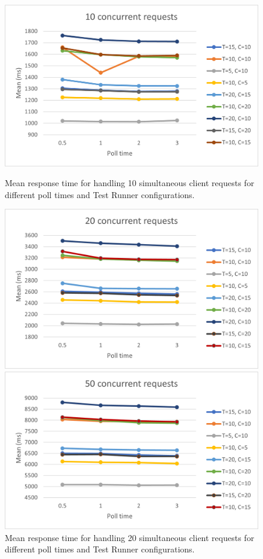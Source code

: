 \begin{figure}[!tbp]
  \centering
  \begin{minipage}[t]{0.4\textwidth}
    \includegraphics[scale=0.65]{images/10.png}
    \caption{Mean response time for handling 10 simultaneous client requests for different poll times and Test Runner configurations.}
  \end{minipage}
  \hfill
  \begin{minipage}[t]{0.4\textwidth}
    \centering
    \includegraphics[scale=0.65]{images/20.png}
    \caption{Mean response time for handling 20 simultaneous client requests for different poll times and Test Runner configurations.}
  \end{minipage}
  \vfill
  \begin{minipage}[t]{0.4\textwidth}
    \centering
    \includegraphics[scale=0.65]{images/50.png}

\end{minipage}
\end{figure}

